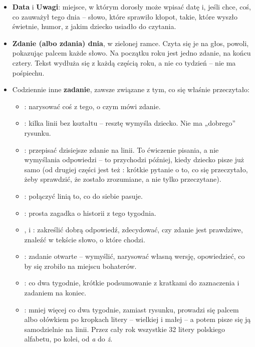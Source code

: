 \begin{itemize}[leftmargin=6mm]
\item \textbf{Data} i \textbf{Uwagi}: miejsce, w którym dorosły może
  wpisać datę i, jeśli chce, coś, co zauważył tego dnia -- słowo, które
  sprawiło kłopot, takie, które wyszło świetnie, humor, z jakim dziecko
  usiadło do czytania.
\item \textbf{Zdanie (albo zdania) dnia}, w zielonej ramce. Czyta się je
  na głos, powoli, pokazując palcem każde słowo. Na początku roku jest
  jedno zdanie, na końcu cztery. Tekst wydłuża się z każdą częścią roku,
  a nie co tydzień -- nie ma pośpiechu.
\item Codziennie inne \textbf{zadanie}, zawsze związane z tym, co się
  właśnie przeczytało:
  \begin{itemize}[leftmargin=6mm]
  \item \textbf{\lblDibuja}: narysować coś z tego, o czym mówi zdanie.
  \item \textbf{\lblCompleta}: kilka linii bez kształtu -- resztę
    wymyśla dziecko. Nie ma „dobrego” rysunku.
  \item \textbf{\lblCopia}: przepisać dzisiejsze zdanie na linii. To
    ćwiczenie pisania, a nie wymyślania odpowiedzi -- to przychodzi
    później, kiedy dziecko pisze już samo (od drugiej części jest też
    \textbf{\lblResponde}: krótkie pytanie o to, co się przeczytało,
    żeby sprawdzić, że zostało zrozumiane, a nie tylko przeczytane).
  \item \textbf{\lblRelaciona}: połączyć linią to, co do siebie pasuje.
  \item \textbf{\lblAdivina}: prosta zagadka o historii z tego tygodnia.
  \item \textbf{\lblRodea}, \textbf{\lblVerdaderoFalso} i
    \textbf{\lblBusca}: zakreślić dobrą odpowiedź, zdecydować, czy
    zdanie jest prawdziwe, znaleźć w tekście słowo, o które chodzi.
  \item \textbf{\lblCrea}: zadanie otwarte -- wymyślić, narysować
    własną wersję, opowiedzieć, co by się zrobiło na miejscu bohaterów.
  \item \textbf{\lblRepasa}: co dwa tygodnie, krótkie podsumowanie z
    kratkami do zaznaczenia i zadaniem na koniec.
  \item \textbf{\lblTraza}: mniej więcej co dwa tygodnie, zamiast
    rysunku, prowadzi się palcem albo ołówkiem po kropkach litery --
    wielkiej i małej -- a potem pisze się ją samodzielnie na linii. Przez
    cały rok wszystkie 32 litery polskiego alfabetu, po kolei, od
    \emph{a} do \emph{ż}.
  \end{itemize}
\end{itemize}

